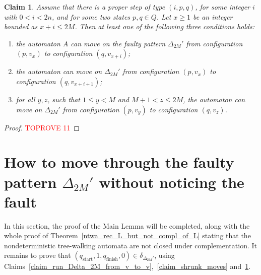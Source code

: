 \documentclass[12pt,a4paper]{article}
\newtheorem{claim}{Claim}
\theoremstyle{definition}
\begin{document}
\begin{claim}\label{claim_stretched_moves}
Assume that there is a proper step of type $(i,p,q)$,
for some integer $i$ with $0 < i < 2n$, 
and for some two states $p,q \in Q$.
Let $x \geqslant 1$ be an integer bounded as $x+i \leqslant 2M$.
Then at least one of the following three conditions holds:
\begin{enumerate}\renewcommand{\theenumi}{\Roman{enumi}}
\item	\label{claim_stretched_moves__x_to_x_plus_i}
	the automaton $A$ can move on the faulty pattern $\Delta_{2M}'$ 
	from configuration $(p,v_x)$ to configuration $(q,v_{x+i})$;
\item	\label{claim_stretched_moves__x_to_x_plus_i_plus_1}
	the automaton can move on $\Delta_{2M}'$ 
	from configuration $(p,v_x)$ to configuration $(q,v_{x+i+1})$;
\item	\label{claim_stretched_moves__y_to_z}
	for all $y,z$, such that $1 \leqslant y < M$ and $M+1 < z \leqslant 2M$,
	the automaton can move
	on $\Delta_{2M}'$ from configuration $(p, v_y)$ to configuration $(q,v_z)$.
\end{enumerate}
\end{claim}

\begin{proof}\textcolor{red}{TOPROVE 11}\end{proof}






\section{How to move through the faulty pattern $\Delta_{2M}'$ without noticing the fault}\label{section_passing_through_Delta_prime_without_noticing_error}

In this section,
the proof of the Main Lemma will be completed,
along with the whole proof of Theorem~\ref{ntwa_rec_L_but_not_compl_of_L}
stating that the nondeterministic tree-walking automata are not closed under complementation.
It remains to prove that
$(q_{\text{start}},1,q_{\text{finish}},0) \in \delta_{\Delta_{2M}'}$,
using Claims~\ref{claim_run_Delta_2M_from_v_to_v},~\ref{claim_shrunk_moves}
and~\ref{claim_stretched_moves}.
\end{document}
